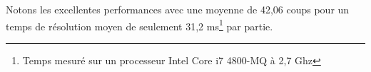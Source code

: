 \begin{center}\label{histo_algo}
\end{center}

Notons les excellentes performances avec une moyenne de 42,06 coups pour un temps de résolution moyen de seulement 31,2 ms\footnote{Temps mesuré sur un processeur Intel Core i7 4800-MQ à 2,7 Ghz} par partie.
